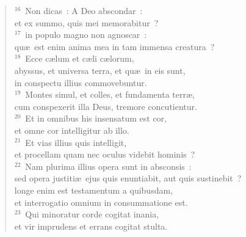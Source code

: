\begin{flushleft}\begin{verse}${}^{16}$~Non dicas~: A Deo abscondar~:\\ et ex summo, quis mei memorabitur~?\\
${}^{17}$~in populo magno non agnoscar~:\\ qu\ae\ est enim anima mea in tam immensa creatura~?\\
${}^{18}$~Ecce c\ae lum et c\ae li c\ae lorum,\\ abyssus, et universa terra, et qu\ae\ in eis sunt,\\ in conspectu illius commovebuntur.\\
${}^{19}$~Montes simul, et colles, et fundamenta terr\ae ,\\ cum conspexerit illa Deus, tremore concutientur.\\
${}^{20}$~Et in omnibus his insensatum est cor,\\ et omne cor intelligitur ab illo.\\
${}^{21}$~Et vias illius quis intelligit,\\ et procellam quam nec oculus videbit hominis~?\\
${}^{22}$~Nam plurima illius opera sunt in absconsis~:\\ sed opera justiti\ae\ ejus quis enuntiabit, aut quis sustinebit~?\\ longe enim est testamentum a quibusdam,\\ et interrogatio omnium in consummatione est.\\
${}^{23}$~Qui minoratur corde cogitat inania,\\ et vir imprudens et errans cogitat stulta.\end{verse}\end{flushleft}


